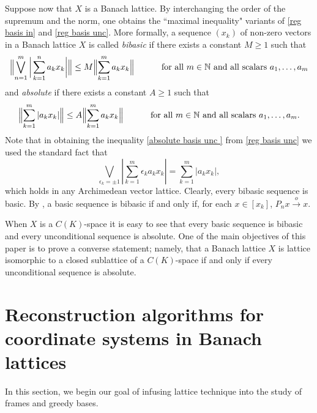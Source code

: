 \documentclass[12pt,leqno]{amsart}
\numberwithin{equation}{section}
\theoremstyle{definition}
\newcommand{\Bignorm}[1]{\Bigl\lVert#1\Bigr\rVert}
\def\N{{\mathbb N}}
\begin{document}
Suppose now that $X$ is a Banach lattice.  By interchanging the order of the supremum and the norm, one obtains the ``maximal inequality" variants of \eqref{reg basis in} and \eqref{reg basis unc}.  More formally, 
a sequence  $(x_k)$ of non-zero vectors in a Banach lattice $X$ is called \emph{bibasic} if there exists a constant $M\geq 1$ such that 
\begin{equation}\label{reg basis in2}
 \Bignorm{ \bigvee_{n=1}^m\bigg|\sum_{k=1}^na_kx_k\bigg|}\le M\Bignorm{\sum_{k=1}^ma_kx_k}\hspace{1cm}\textrm{ for all $m\in\N$ and all scalars $a_1,\dots,a_m$}
\end{equation}
and \emph{absolute} if there exists a constant $A\geq 1$ such that 
 \begin{equation}\label{absolute basis unc }
\Bignorm{\sum_{k=1}^m |a_kx_k|}
  \leq A\Bignorm{\sum_{k=1}^ma_kx_k}\hspace{1cm}\textrm{ for all $m\in\N$ and all scalars $a_1,\dots,a_m$.}
\end{equation}
Note that in obtaining the inequality \eqref{absolute basis unc } from \eqref{reg basis unc} we used the standard fact that 
\begin{equation}\label{standard sup}
    \bigvee_{\epsilon_k=\pm 1}\left|\sum_{k=1}^m \epsilon_ka_kx_k\right|=\sum_{k=1}^m |a_kx_k|,
\end{equation}
which holds in any Archimedean vector lattice. Clearly, every bibasic sequence is basic.  By , a basic sequence is bibasic  if and only if, for each $x\in [x_k]$, $P_nx\xrightarrow{o}x$. %
\medskip

  When $X$ is a $C(K)$-space it is easy to see  that every basic sequence is  bibasic and   every unconditional sequence is absolute. One of the main objectives of this paper  is to prove a converse statement; namely, that a Banach lattice $X$ is lattice isomorphic to a closed sublattice of a $C(K)$-space if and only if every unconditional sequence is absolute.

\section{Reconstruction algorithms for coordinate systems in Banach lattices}\label{Section3}
In this section, we begin our goal of infusing lattice technique into the study of frames and greedy bases. 
\end{document}
